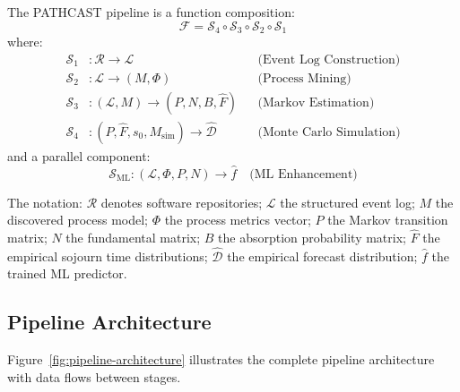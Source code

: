 \begin{definition}
\label{def:pipeline}
The PATHCAST pipeline is a function composition:
\begin{equation}
\label{eq:pipeline}
\mathcal{F} = \mathcal{S}_4 \circ \mathcal{S}_3 \circ \mathcal{S}_2 \circ \mathcal{S}_1
\end{equation}
where:
\begin{align}
\mathcal{S}_1 &: \mathcal{R} \to \mathcal{L}
    && \text{(Event Log Construction)} \label{eq:stage1-sig} \\
\mathcal{S}_2 &: \mathcal{L} \to (M, \Phi)
    && \text{(Process Mining)} \label{eq:stage2-sig} \\
\mathcal{S}_3 &: (\mathcal{L}, M) \to (P, N, B, \hat{F})
    && \text{(Markov Estimation)} \label{eq:stage3-sig} \\
\mathcal{S}_4 &: (P, \hat{F}, s_0, M_{\text{sim}}) \to \hat{\mathcal{D}}
    && \text{(Monte Carlo Simulation)} \label{eq:stage4-sig}
\end{align}
and a parallel component:
\begin{equation}
\mathcal{S}_{\text{ML}} : (\mathcal{L}, \Phi, P, N) \to \hat{f}
    \quad \text{(ML Enhancement)} \label{eq:ml-sig}
\end{equation}
\end{definition}

The notation: $\mathcal{R}$ denotes software repositories; $\mathcal{L}$
the structured event log; $M$ the discovered process model; $\Phi$ the
process metrics vector; $P$ the Markov transition matrix; $N$ the
fundamental matrix; $B$ the absorption probability matrix; $\hat{F}$ the
empirical sojourn time distributions; $\hat{\mathcal{D}}$ the empirical
forecast distribution; $\hat{f}$ the trained ML predictor.

\subsection{Pipeline Architecture}
\label{sec:pipeline-arch}

Figure~\ref{fig:pipeline-architecture} illustrates the complete pipeline
architecture with data flows between stages.

